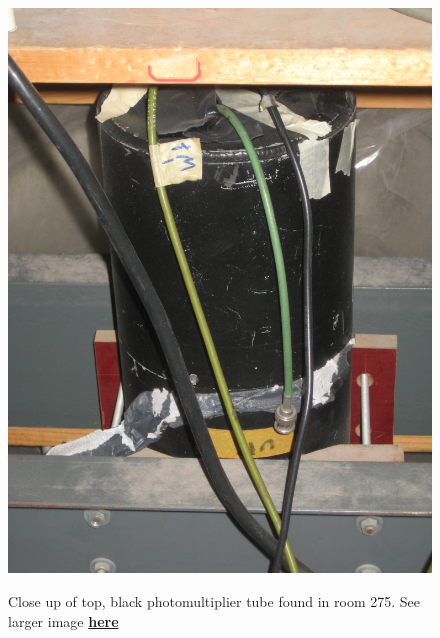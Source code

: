 \documentclass{../lab}
\begin{document}
\begin{figure}[h]
\begin{minipage}{0.20\textwidth}
    \href{http://experimentationlab.berkeley.edu/sites/default/files/images/MUO_PMT_3563.jpg}{\includegraphics[width=\linewidth,keepaspectratio]{images/MUO_PMT_3563.jpg}}
    \caption{Close up of top, black photomultiplier tube found in room 275. See larger image \href{http://experimentationlab.berkeley.edu/sites/default/files/images/MUO_PMT_3563.jpg}{\textbf{here}}}
\end{minipage}
\begin{minipage}{0.33\textwidth}

\end{minipage}
\end{figure}
\end{document}
